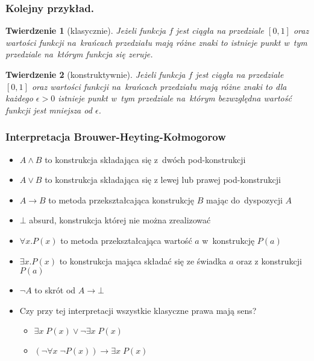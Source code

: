 \documentclass{beamer}
\newtheorem{thm}{Twierdzenie}
\begin{document}

\begin{frame}
\frametitle{Kolejny przykład.}

\begin{thm}[klasycznie]
 Jeżeli funkcja $f$ jest ciągła na przedziale $[0, 1]$ oraz wartości funkcji na~krańcach przedziału mają różne znaki
to istnieje punkt w~tym przedziale na~którym funkcja się zeruje.
\end{thm}

\begin{thm}[konstruktywnie]
 Jeżeli funkcja $f$ jest ciągła na przedziale $[0, 1]$ oraz wartości funkcji na~krańcach przedziału mają różne znaki
to dla każdego $\epsilon > 0$ istnieje punkt w~tym przedziale na~którym bezwzględna wartość funkcji jest mniejsza od
$\epsilon$.
\end{thm}

\end{frame}



\begin{frame}
\frametitle{Interpretacja Brouwer-Heyting-Kołmogorow}

\begin{itemize}
 \item $A \wedge B$ to konstrukcja składająca się z~dwóch pod-konstrukcji
 \item $A \vee B$ to konstrukcja składająca się z lewej lub prawej pod-konstrukcji
 \item $A \to B$ to metoda przekształcająca konstrukcję $B$ mając do~dyspozycji $A$
 \item $\bot$ absurd, konstrukcja której nie można zrealizować
 \item $\forall x. P(x)$ to metoda przekształcająca wartość $a$ w~konstrukcję $P(a)$
 \item $\exists x. P(x)$ to konstrukcja mająca składać się ze świadka $a$ oraz z konstrukcji $P(a)$
 \item $\neg A$ to skrót od $A \to \bot$ 
 \item Czy przy tej interpretacji wszystkie klasyczne prawa mają sens?
\begin{itemize}
\item $\exists x\;P(x) \vee \neg \exists x\;P(x)$
\item $(\neg \forall x\;\neg P(x) ) \to \exists x\;P(x)$
\end{itemize}

\end{itemize}


\end{frame}
\end{document}
